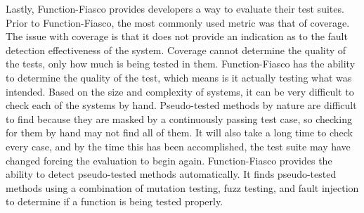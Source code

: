 Lastly, Function-Fiasco provides developers a way to evaluate their test suites. Prior to Function-Fiasco, the most commonly used metric was that of coverage. The issue with coverage is that it does not provide an indication as to the fault detection effectiveness of the system. Coverage cannot determine the quality of the tests, only how much is being tested in them. Function-Fiasco has the ability to determine the quality of the test, which means is it actually testing what was intended. Based on the size and complexity of systems, it can be very difficult to check each of the systems by hand. Pseudo-tested methods by nature are difficult to find because they are masked by a continuously passing test case, so checking for them by hand may not find all of them. It will also take a long time to check every case, and by the time this has been accomplished, the test suite may have changed forcing the evaluation to begin again. Function-Fiasco provides the ability to detect pseudo-tested methods automatically. It finds pseudo-tested methods using a combination of mutation testing, fuzz testing, and fault injection to determine if a function is being tested properly.
